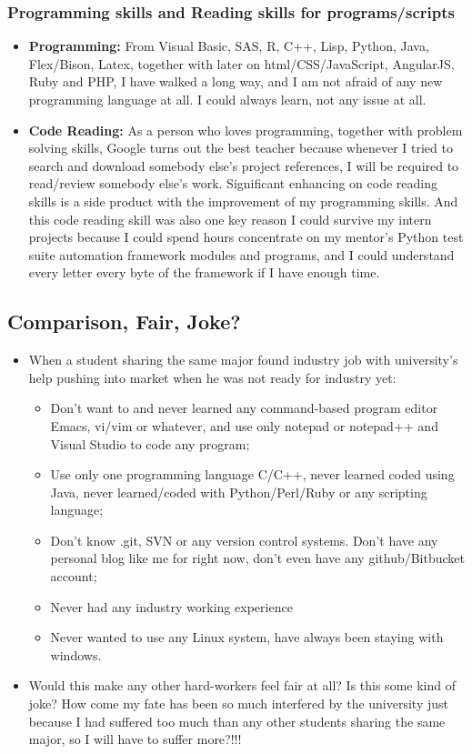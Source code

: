 \documentclass[9pt,b5paper]{article}
\begin{document}
\subsubsection{Programming skills and Reading skills for programs/scripts}
\label{sec-8-1-3}
\begin{itemize}
\item \textbf{Programming:} From Visual Basic, SAS, R, C++, Lisp, Python, Java, Flex/Bison, Latex, together with later on html/CSS/JavaScript, AngularJS, Ruby and PHP, I have walked a long way, and I am not afraid of any new programming language at all. I could always learn, not any issue at all.
\item \textbf{Code Reading:} As a person who loves programming, together with problem solving skills, Google turns out the best teacher because whenever I tried to search and download somebody else's project references, I will be required to read/review somebody else's work. Significant enhancing on code reading skills is a side product with the improvement of my programming skills. And this code reading skill was also one key reason I could survive my intern projects because I could spend hours concentrate on my mentor's Python test suite automation framework modules and programs, and I could understand every letter every byte of the framework if I have enough time.
\end{itemize}
\subsection{Comparison, Fair, Joke?}
\label{sec-8-2}
\begin{itemize}
\item When a student sharing the same major found industry job with university's help pushing into market when he was not ready for industry yet:
\begin{itemize}
\item Don't want to and never learned any command-based program editor Emacs, vi/vim or whatever, and use only notepad or notepad++ and Visual Studio to code any program;
\item Use only one programming language C/C++, never learned coded using Java, never learned/coded with Python/Perl/Ruby or any scripting language;
\item Don't know .git, SVN or any version control systems. Don't have any personal blog like me for right now, don't even have any github/Bitbucket account;
\item Never had any industry working experience
\item Never wanted to use any Linux system, have always been staying with windows.
\end{itemize}
\item Would this make any other hard-workers feel fair at all? Is this some kind of joke? How come my fate has been so much interfered by the university just because I had suffered too much than any other students sharing the same major, so I will have to suffer more?!!!
\end{itemize}
\end{document}
